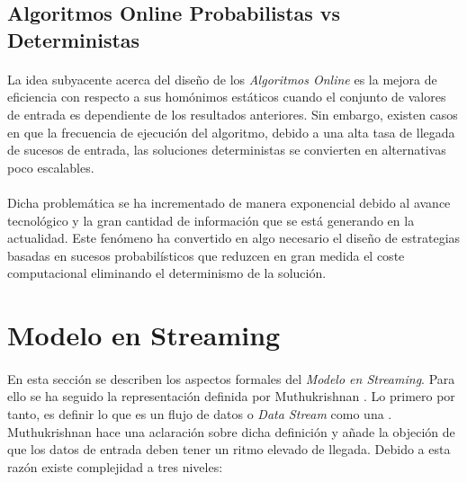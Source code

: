 \documentclass{subfiles}
\begin{document}
      \subsection{Algoritmos Online Probabilistas vs Deterministas}

        \paragraph{}
        La idea subyacente acerca del diseño de los \emph{Algoritmos Online} es la mejora de eficiencia con respecto a sus homónimos estáticos cuando el conjunto de valores de entrada es dependiente de los resultados anteriores. Sin embargo, existen casos en que la frecuencia de ejecución del algoritmo, debido a una alta tasa de llegada de sucesos de entrada, las soluciones deterministas se convierten en alternativas poco escalables.

        \paragraph{}
        Dicha problemática se ha incrementado de manera exponencial debido al avance tecnológico y la gran cantidad de información que se está generando en la actualidad. Este fenómeno ha convertido en algo necesario el diseño de estrategias basadas en sucesos probabilísticos que reduzcen en gran medida el coste computacional eliminando el determinismo de la solución.


    \section{Modelo en Streaming}
    \label{sec:streaming_model}

      \paragraph{}
      En esta sección se describen los aspectos formales del \emph{Modelo en Streaming}. Para ello se ha seguido la representación definida por Muthukrishnan \cite{Muthukrishnan:2005:DSA:1166409.1166410}. Lo primero por tanto, es definir lo que es un flujo de datos o \emph{Data Stream} como una  \cite{ITS-def-data-stream}. Muthukrishnan \cite{Muthukrishnan:2005:DSA:1166409.1166410} hace una aclaración sobre dicha definición y añade la objeción de que los datos de entrada deben tener un ritmo elevado de llegada. Debido a esta razón existe complejidad a tres niveles:
\end{document}
